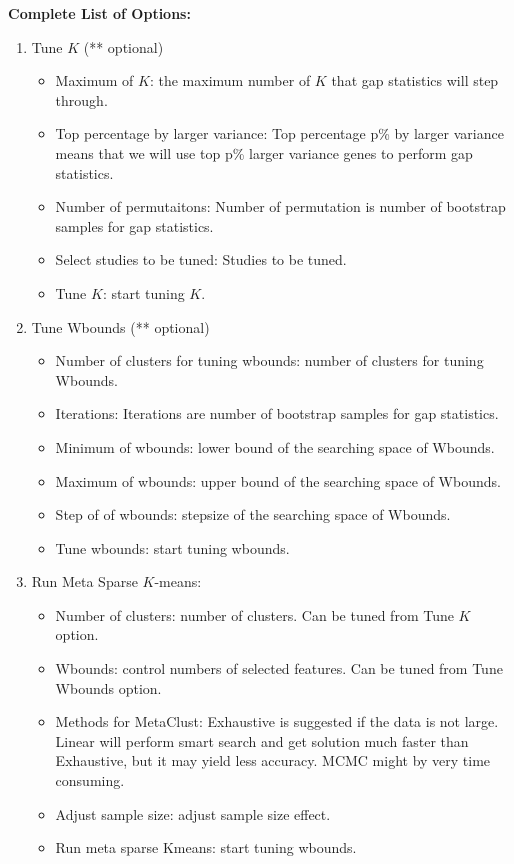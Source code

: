 \textbf{Complete List of Options:} 
\begin{enumerate}
\item Tune $K$ (** optional)
\begin{itemize}
\item Maximum of $K$: the maximum number of $K$ that gap statistics will step through.
\item Top percentage by larger variance: Top percentage p\% by larger variance means that we will use top p\% larger variance genes to perform gap statistics.
\item Number of permutaitons: Number of permutation is number of bootstrap samples for gap statistics.
\item Select studies to be tuned: Studies to be tuned.
\item Tune $K$: start tuning $K$.
\end{itemize}
\item Tune Wbounds (** optional)
\begin{itemize}
\item Number of clusters for tuning wbounds: number of clusters for tuning Wbounds.
\item Iterations: Iterations are number of bootstrap samples for gap statistics.
\item Minimum of wbounds: lower bound of the searching space of Wbounds.
\item Maximum of wbounds: upper bound of the searching space of Wbounds.
\item Step of of wbounds: stepsize of the searching space of Wbounds.
\item Tune wbounds: start tuning wbounds.
\end{itemize}
\item Run Meta Sparse $K$-means: 
\begin{itemize}
\item Number of clusters: number of clusters. Can be tuned from Tune $K$ option.
\item Wbounds: control numbers of selected features. Can be tuned from Tune Wbounds option.
\item Methods for MetaClust: Exhaustive is suggested if the data is not large.
Linear will perform smart search and get solution much faster than Exhaustive, 
but it may yield less accuracy.
MCMC might by very time consuming.
\item Adjust sample size: adjust sample size effect.
\item Run meta sparse Kmeans: start tuning wbounds.
\end{itemize}

\end{enumerate}


